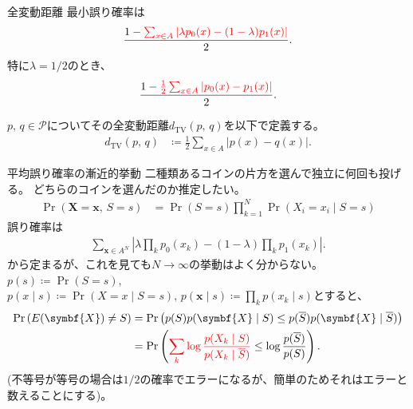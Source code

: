 \documentclass[lualatex,handout]{beamer}
\newcommand{\mycolor}[2]{%
  \begingroup
  \colorlet{currentcolor}{.}%
  \color{#1}#2%
  \color{currentcolor}%
  \endgroup
}
\newcommand{\emm}[1]{\mycolor{red}{#1}}
\newcommand\dtv{d_{\mathrm{TV}}}
\theoremstyle{definition}
\begin{document}
\begin{frame}{全変動距離}
最小誤り確率は
\begin{align*}
\frac{1-\emm{\sum_{x\in A}\left|\lambda p_0(x) - (1-\lambda) p_1(x) \right|}}2.
\end{align*}
特に$\lambda=1/2$のとき、
\begin{align*}
\frac{1-\emm{\frac12\sum_{x\in A}\left|p_0(x) - p_1(x) \right|}}2.
\end{align*}
\begin{definition}
$p,\, q\in\mathcal{P}$についてその全変動距離$\dtv(p,\,q)$を以下で定義する。
\begin{align*}
\dtv(p,\, q) &\coloneq
\frac12\sum_{x\in A}\left|p(x) - q(x) \right|.
\end{align*}
\end{definition}
\end{frame}



\begin{frame}{平均誤り確率の漸近的挙動}
\small
二種類あるコインの片方を選んで独立に何回も投げる。
どちらのコインを選んだのか推定したい。
\begin{align*}
\Pr(\symbf{X}=\symbf{x},\, S= s) &= \Pr(S=s)\prod_{k=1}^N \Pr(X_i=x_i \mid S=s)
\end{align*}
誤り確率は
\begin{align*}
\sum_{\symbf{x}\in A^N}\left|\lambda\prod_k p_0(x_k) - (1-\lambda)\prod_kp_1(x_k) \right|.
\end{align*}
から定まるが、これを見ても$N\to\infty$の挙動はよく分からない。
$p(s)\coloneq \Pr(S=s)$,
$p(x\mid s) \coloneq \Pr(X=x\mid S=s),\, p(\symbf{x}\mid s)\coloneq \prod_k p(x_k\mid s)$とすると、
\begin{align*}
\Pr\left(E(\symbf{X}) \ne S\right)
&= \Pr\left(p(S) p(\symbf{X}\mid S) \le p(\overline{S}) p(\symbf{X}\mid \overline{S})\right)\\
&= \Pr\left(\emm{\sum_k \log\frac{p(X_k\mid S)}{p(X_k\mid \overline{S})}} \le \log\frac{p(\overline{S})}{p(S)}\right).
\end{align*}
(不等号が等号の場合は$1/2$の確率でエラーになるが、簡単のためそれはエラーと数えることにする)。
\end{frame}
\end{document}
